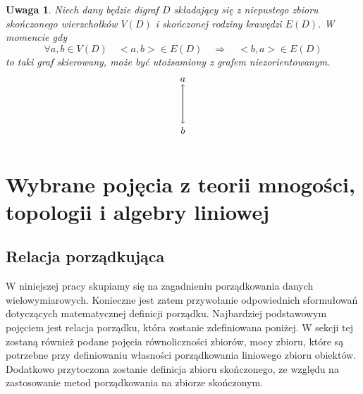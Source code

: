 \documentclass[12pt,a4paper]{report}
\newtheorem{definition}[theorem]{Definicja}
\newtheorem{uwaga}{Uwaga}
\begin{document}
\begin{uwaga}
Niech dany będzie digraf $D$ składający się z niepustego zbioru skończonego wierzchołków $V(D)$ i skończonej rodziny krawędzi $E(D)$. W momencie gdy $$\forall{a,b} \in V(D) \quad  <a,b>  \in E(D) \quad \Rightarrow \quad <b,a>  \in E(D)$$ to taki graf skierowany, może być utożsamiony z grafem niezorientowanym. 
$$
\begin{tikzpicture}[scale=.7]
\draw [->] (0,-2) --(0,0) ;
 \draw node(a) at (0,0.25) {$a$};
 \draw [->] (0,0) --(0,-2); 
 \draw node (b) at (0, -2.35) {$b$};
\end{tikzpicture}
$$

\end{uwaga}






\section{Wybrane pojęcia z teorii mnogości, topologii i algebry liniowej}\label{teoria mnogosci}
\subsection{Relacja porządkująca}


W niniejszej pracy skupiamy się na zagadnieniu porządkowania danych wielowymiarowych. Konieczne jest zatem przywołanie odpowiednich sformułowań dotyczących matematycznej definicji porządku. Najbardziej podstawowym pojęciem jest relacja porządku, która zostanie zdefiniowana poniżej. W sekcji tej zostaną również podane pojęcia równoliczności zbiorów, mocy zbioru, które są potrzebne przy definiowaniu własności porządkowania liniowego zbioru obiektów. Dodatkowo przytoczona zostanie definicja zbioru skończonego, ze względu na zastosowanie metod porządkowania na zbiorze skończonym.

\end{document}
